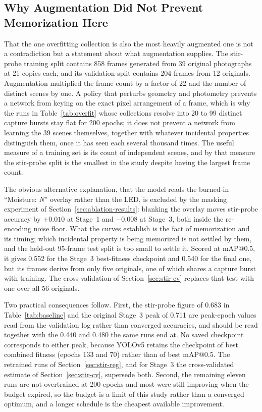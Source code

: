 ﻿\documentclass[journal]{IEEEtran}
\begin{document}
\subsection{Why Augmentation Did Not Prevent Memorization Here}
\label{sec:aug-limits}
That the one overfitting collection is also the most heavily augmented one is not a contradiction but a statement about what augmentation supplies. The stir-probe training split contains 858 frames generated from 39 original photographs at 21 copies each, and its validation split contains 204 frames from 12 originals. Augmentation multiplied the frame count by a factor of 22 and the number of distinct scenes by one. A policy that perturbs geometry and photometry prevents a network from keying on the exact pixel arrangement of a frame, which is why the runs in Table~\ref{tab:overfit} whose collections resolve into 20 to 99 distinct capture bursts stay flat for 200 epochs; it does not prevent a network from learning the 39 scenes themselves, together with whatever incidental properties distinguish them, once it has seen each several thousand times. The useful measure of a training set is its count of independent scenes, and by that measure the stir-probe split is the smallest in the study despite having the largest frame count.

The obvious alternative explanation, that the model reads the burned-in ``Moisture: \emph{N}'' overlay rather than the LED, is excluded by the masking experiment of Section~\ref{sec:ablation-results}: blanking the overlay moves stir-probe accuracy by $+0.010$ at Stage~1 and $-0.008$ at Stage~3, both inside the re-encoding noise floor. What the curves establish is the fact of memorization and its timing; which incidental property is being memorized is not settled by them, and the held-out 95-frame test split is too small to settle it. Scored at $\text{mAP@0.5}$, it gives 0.552 for the Stage~3 best-fitness checkpoint and 0.540 for the final one, but its frames derive from only five originals, one of which shares a capture burst with training. The cross-validation of Section~\ref{sec:stir-cv} replaces that test with one over all 56 originals.

Two practical consequences follow. First, the stir-probe figure of 0.683 in Table~\ref{tab:baseline} and the original Stage~3 peak of 0.711 are peak-epoch values read from the validation log rather than converged accuracies, and should be read together with the 0.440 and 0.480 the same runs end at. No saved checkpoint corresponds to either peak, because YOLOv5 retains the checkpoint of best combined fitness (epochs 133 and 70) rather than of best $\text{mAP@0.5}$. The retrained runs of Section~\ref{sec:stir-reg}, and for Stage~3 the cross-validated estimate of Section~\ref{sec:stir-cv}, supersede both. Second, the remaining eleven runs are not overtrained at 200 epochs and most were still improving when the budget expired, so the budget is a limit of this study rather than a converged optimum, and a longer schedule is the cheapest available improvement.
\end{document}
